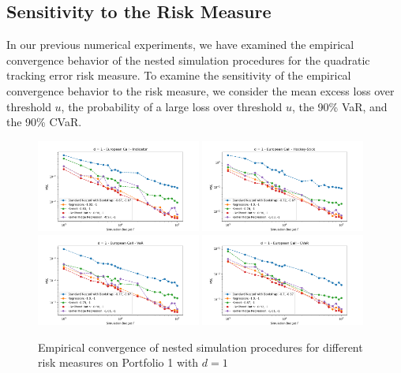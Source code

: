\documentclass{article}
\begin{document}
\subsection{Sensitivity to the Risk Measure} \label{sec:sensitivity-risk-measure}

In our previous numerical experiments, we have examined the empirical convergence behavior of the nested simulation procedures for the quadratic tracking error risk measure.
To examine the sensitivity of the empirical convergence behavior to the risk measure, we consider the mean excess loss over threshold $u$, the probability of a large loss over threshold $u$, the 90\% VaR, and the 90\% CVaR.

\begin{figure}[ht!] 
    \centering
    \includegraphics[width=0.48\textwidth]{./figures/convergence/5101.png}
    \includegraphics[width=0.48\textwidth]{./figures/convergence/5102.png}
    \includegraphics[width=0.48\textwidth]{./figures/convergence/5104.png}
    \includegraphics[width=0.48\textwidth]{./figures/convergence/5105.png}
    \caption{Empirical convergence of nested simulation procedures for different risk measures on Portfolio 1 with $d=1$}
    \label{fig:510x}
\end{figure}
\end{document}
